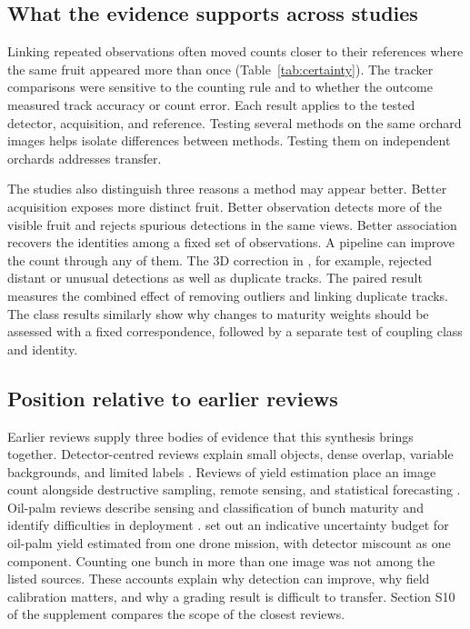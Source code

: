 \subsection{What the evidence supports across studies}

Linking repeated observations often moved counts closer to their references where the same fruit appeared more than once (Table~\ref{tab:certainty}). The tracker comparisons were sensitive to the counting rule and to whether the outcome measured track accuracy or count error. Each result applies to the tested detector, acquisition, and reference. Testing several methods on the same orchard images helps isolate differences between methods. Testing them on independent orchards addresses transfer.

The studies also distinguish three reasons a method may appear better. Better acquisition exposes more distinct fruit. Better observation detects more of the visible fruit and rejects spurious detections in the same views. Better association recovers the identities among a fixed set of observations. A pipeline can improve the count through any of them. The 3D correction in \citet{liu2018robust}, for example, rejected distant or unusual detections as well as duplicate tracks. The paired result measures the combined effect of removing outliers and linking duplicate tracks. The class results similarly show why changes to maturity weights should be assessed with a fixed correspondence, followed by a separate test of coupling class and identity.



\subsection{Position relative to earlier reviews}\label{sec:position}

Earlier reviews supply three bodies of evidence that this synthesis brings together. Detector-centred reviews explain small objects, dense overlap, variable backgrounds, and limited labels \citep{koirala2019deepb,gong2025fruit}. Reviews of yield estimation place an image count alongside destructive sampling, remote sensing, and statistical forecasting \citep{anderson2021technologies,he2022fruit,trentin2024tree}. Oil-palm reviews describe sensing and classification of bunch maturity and identify difficulties in deployment \citep{lai2023oil,goh2025fresh,nordin2026systematic}. \citet{gunawan2026drone} set out an indicative uncertainty budget for oil-palm yield estimated from one drone mission, with detector miscount as one component. Counting one bunch in more than one image was not among the listed sources. These accounts explain why detection can improve, why field calibration matters, and why a grading result is difficult to transfer. Section S10 of the supplement compares the scope of the closest reviews.

